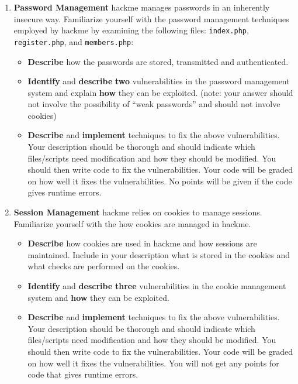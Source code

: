 \documentclass[]{article}
\begin{document}
\begin{enumerate}
	\item \textbf{Password Management} hackme manages passwords in an inherently insecure way. Familiarize yourself with the password management techniques employed by hackme by examining the following files: \verb"index.php", \verb"register.php", and \verb"members.php":
		\begin{itemize}
			\item \textbf{Describe} how the passwords are stored, transmitted and authenticated. 
			\item \textbf{Identify} and \textbf{describe} \textbf{two} vulnerabilities in the password management system and explain \textbf{how} they can be exploited. (note: your answer should not involve the possibility of ``weak passwords'' and should not involve cookies)
			\item \textbf{Describe} and \textbf{implement} techniques to fix the above vulnerabilities. Your description should be thorough and should indicate which files/scripts need modification and how they should be modified. You should then write code to fix the vulnerabilities. Your code will be graded on how well it fixes the vulnerabilities. No points will be given if the code gives runtime errors.
		\end{itemize}
	\item \textbf{Session Management} hackme relies on cookies to manage sessions. Familiarize yourself with the how cookies are managed in hackme.
		\begin{itemize}
			\item \textbf{Describe} how cookies are used in hackme and how sessions are maintained. Include in your description what is stored in the cookies and what checks are performed on the cookies.
			\item \textbf{Identify} and \textbf{describe} \textbf{three} vulnerabilities in the cookie management system and \textbf{how} they can be exploited.
			\item \textbf{Describe} and \textbf{implement} techniques to fix the above vulnerabilities. Your description should be thorough and should indicate which files/scripts need modification and how they should be modified. You should then write code to fix the vulnerabilities. Your code will be graded on how well it fixes the vulnerabilities. You will not get any points for code that gives runtime errors.
		\end{itemize}
\end{enumerate}
\end{document}
